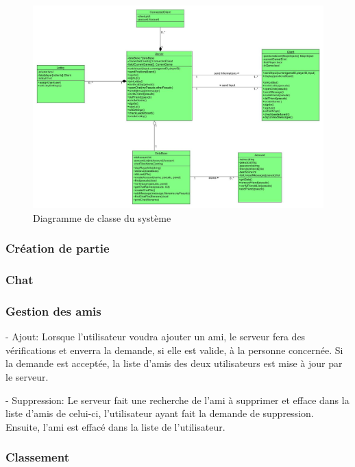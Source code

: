 \documentclass[a4paper,12pt]{article}
\begin{document}
\begin{figure}[h!]
\centering
\includegraphics[width=16cm]{newSystemClassDiagram.jpg}
\caption{Diagramme de classe du système}
\label{fig:UerUseCase}
\end{figure}


\subsubsection{Création de partie}


\subsubsection{Chat}


\subsubsection{Gestion des amis}

- Ajout: Lorsque l'utilisateur voudra ajouter un ami, le serveur fera des vérifications et enverra la demande, si elle est valide, à la personne concernée. Si la demande est acceptée, la liste d'amis des deux utilisateurs est mise à jour par le serveur.

- Suppression: Le serveur fait une recherche de l'ami à supprimer et efface dans la liste d'amis de celui-ci, l'utilisateur ayant fait la demande de suppression. Ensuite, l'ami est effacé dans la liste de l'utilisateur.


\subsubsection{Classement}
\end{document}
